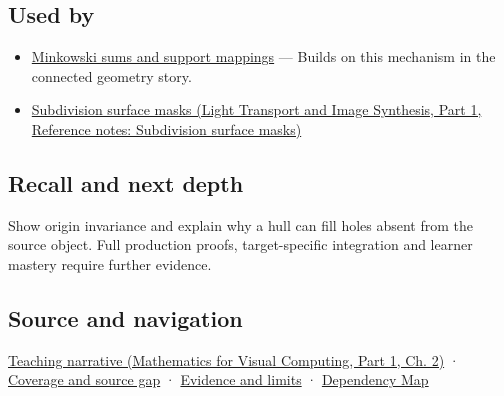 \subsection{Used by}\label{appendix-0026ec42c9d5-used-by}

\hypertarget{appendix-0026ec42c9d5-used-by}{}

\begin{itemize}
\tightlist
\item
  \hyperref[appendix-215ac7099a82]{Minkowski sums and support mappings} --- Builds on this mechanism in the connected geometry story.
\item
  \href{../04-Light-Transport-and-Image-Synthesis-P01/main.pdf\#nameddest=appendix-0234ab7f86b1}{Subdivision surface masks (Light Transport and Image Synthesis, Part 1, Reference notes: Subdivision surface masks)}
\end{itemize}

\subsection{Recall and next depth}\label{appendix-0026ec42c9d5-recall-and-next-depth}

\hypertarget{appendix-0026ec42c9d5-recall-and-next-depth}{}

Show origin invariance and explain why a hull can fill holes absent from the source object. Full production proofs, target-specific integration and learner mastery require further evidence.

\subsection{Source and navigation}\label{appendix-0026ec42c9d5-source-and-navigation}

\hypertarget{appendix-0026ec42c9d5-source-and-navigation}{}

\href{../02-Mathematics-for-Visual-Computing-P01/main.pdf\#nameddest=01-foundations-i-ch018-weighted-points-lead-from-affine-geometry-to-collision-shapes}{Teaching narrative (Mathematics for Visual Computing, Part 1, Ch. 2)} · \hyperref[appendix-fd090d982a15-phase-6---parts-501-600]{Coverage and source gap} · \hyperref[appendix-a103e7846d21-phase-6---source-analysis-and-verification]{Evidence and limits} · \hyperref[appendix-4ad47bdd269a]{Dependency Map}
